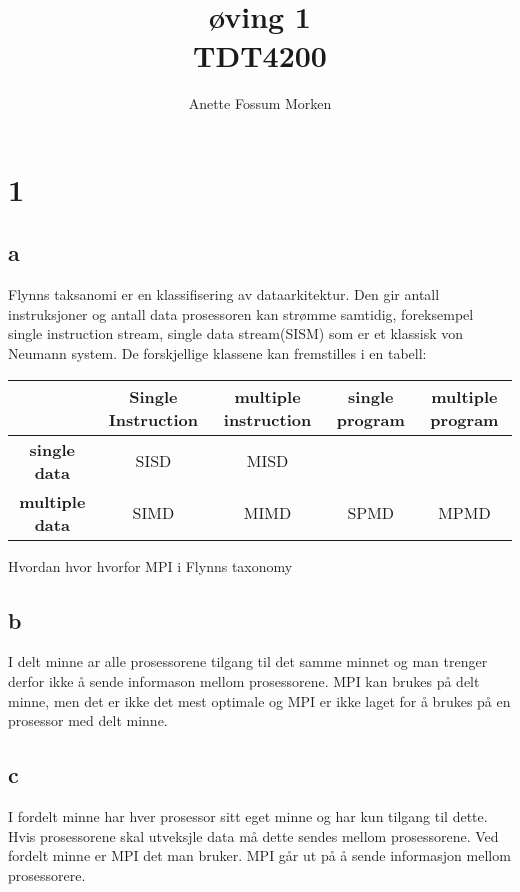 \documentclass[12pt, a4paper]{article} %
\title{øving 1 \\ TDT4200}
\author[1]{Anette Fossum Morken}
\date{}
\begin{document}
\maketitle

\section*{1}
\subsection*{a}
Flynns taksanomi er en klassifisering av dataarkitektur. Den gir antall instruksjoner og antall data prosessoren kan strømme samtidig, foreksempel single instruction stream, single data stream(SISM) som er et klassisk von Neumann system. De forskjellige klassene kan fremstilles i en tabell:

  \begin{tabular}{|@{}c@{}| @{}c@{} |@{}c@{}|@{} c@{} |@{}c@{}| }
    \hline
     & \textbf{Single Instruction} & \textbf{multiple instruction} & \textbf{single program} & \textbf{multiple program} \\ \hline
    \textbf{single data} & SISD & MISD & &  \\ \hline
    \textbf{multiple data} & SIMD & MIMD & SPMD & MPMD \\
    \hline
  \end{tabular}

Hvordan 
hvor 
hvorfor  MPI i Flynns taxonomy

\subsection*{b}
I delt minne ar alle prosessorene tilgang til det samme minnet og man trenger derfor ikke å sende informason mellom prosessorene. MPI kan brukes på delt minne, men det er ikke det mest optimale og MPI er ikke laget for å brukes på en prosessor med delt minne.

\subsection*{c}
I fordelt minne har hver prosessor sitt eget minne og har kun tilgang til dette. Hvis prosessorene skal utveksjle data må dette sendes mellom prosessorene. Ved fordelt minne er MPI det man bruker. MPI går ut på å sende informasjon mellom prosessorere.
\end{document}
